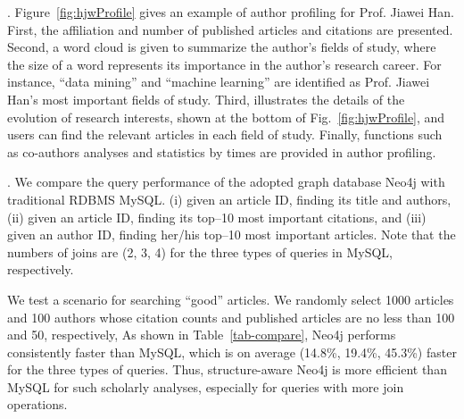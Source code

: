 





.
Figure~\ref{fig:hjwProfile} gives an example of author profiling for Prof. Jiawei Han.
First, the affiliation and number of published articles and citations are presented.
Second, a word cloud is given to summarize the author's fields of study, where the size of a word represents its importance in the author's research career. For instance, ``data mining'' and ``machine learning'' are identified as Prof. Jiawei Han's most important fields of study.
Third, \oursystem illustrates the details of the evolution of research interests, shown at the bottom of Fig.~\ref{fig:hjwProfile}, and users can find the relevant articles in each field of study.
Finally, functions such as co-authors analyses and statistics by times are provided in author profiling.





.
We compare the query performance of the adopted graph database Neo4j with traditional RDBMS MySQL.  \ie (i) given an article ID, finding its title and authors, (ii)  given an article ID, finding its top--10 most important citations, and (iii) given an author ID, finding her/his top--10 most important articles. Note that the numbers of joins are (2, 3, 4) for the three types of queries in MySQL, respectively.

We test a scenario for searching ``good'' articles. We randomly select 1000 articles and 100 authors whose citation counts and published articles are no less than 100 and 50, respectively,  As shown in Table~\ref{tab-compare}, Neo4j performs consistently faster than MySQL, which is on average (14.8\%, 19.4\%, 45.3\%) faster for the three types of queries.
Thus, structure-aware Neo4j is more efficient than MySQL for such scholarly analyses, especially for queries with more join operations.


